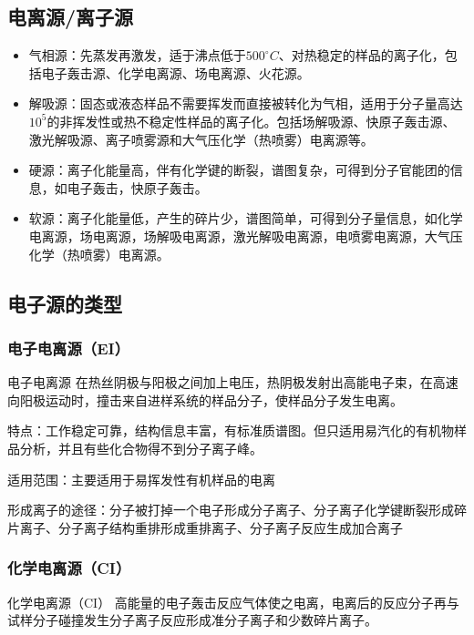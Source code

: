 \subsection{电离源/离子源}
\begin{itemize}
    \item 气相源：先蒸发再激发，适于沸点低于$500^{\circ} C$、对热稳定的样品的离子化，包括电子轰击源、化学电离源、场电离源、火花源。
    \item 解吸源：固态或液态样品不需要挥发而直接被转化为气相，适用于分子量高达$10^5$的非挥发性或热不稳定性样品的离子化。包括场解吸源、快原子轰击源、激光解吸源、离子喷雾源和大气压化学（热喷雾）电离源等。
    \item 硬源：离子化能量高，伴有化学键的断裂，谱图复杂，可得到分子官能团的信息，如电子轰击，快原子轰击。
    \item 软源：离子化能量低，产生的碎片少，谱图简单，可得到分子量信息，如化学电离源，场电离源，场解吸电离源，激光解吸电离源，电喷雾电离源，大气压化学（热喷雾）电离源。
\end{itemize}
\subsection{电子源的类型}
 \subsubsection*{电子电离源（EI）}
    \begin{definition*}{电子电离源}
        在热丝阴极与阳极之间加上电压，热阴极发射出高能电子束，在高速向阳极运动时，撞击来自进样系统的样品分子，使样品分子发生电离。
    \end{definition*}
    特点：工作稳定可靠，结构信息丰富，有标准质谱图。但只适用易汽化的有机物样品分析，并且有些化合物得不到分子离子峰。

    适用范围：主要适用于易挥发性有机样品的电离

    

    \begin{note}
        形成离子的途径：分子被打掉一个电子形成分子离子、分子离子化学键断裂形成碎片离子、分子离子结构重排形成重排离子、分子离子反应生成加合离子
    \end{note}
\subsubsection*{化学电离源（CI）}
    \begin{definition*}{化学电离源（CI）}
        高能量的电子轰击反应气体使之电离，电离后的反应分子再与试样分子碰撞发生分子离子反应形成准分子离子和少数碎片离子。
    \end{definition*}
    
